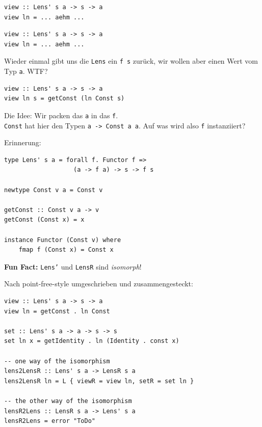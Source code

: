 \documentclass{beamer}
\begin{document}

\begin{frame}[fragile]
\begin{overprint}
\begin{verbatim}
view :: Lens' s a -> s -> a
view ln = ... aehm ...
\end{verbatim}
\begin{verbatim}
view :: Lens' s a -> s -> a
view ln = ... aehm ...
\end{verbatim}
Wieder einmal gibt uns die \texttt{Lens} ein \texttt{f s} zurück, wir wollen aber 
einen Wert vom Typ \texttt{a}. WTF?
\begin{verbatim}
view :: Lens' s a -> s -> a
view ln s = getConst (ln Const s) 
\end{verbatim}
\smallskip
Die Idee: Wir packen das \texttt{a} in das \texttt{f}.\\ \texttt{Const} hat hier den Typen \texttt{a -> Const a a}. Auf was wird also \texttt{f} instanziiert?
\end{overprint}
\vspace{0.3cm}
\begin{overprint}
Erinnerung:
\begin{verbatim}
type Lens' s a = forall f. Functor f =>
                   (a -> f a) -> s -> f s
                   
newtype Const v a = Const v

getConst :: Const v a -> v
getConst (Const x) = x

instance Functor (Const v) where
    fmap f (Const x) = Const x
\end{verbatim}
\end{overprint}

\end{frame}


\begin{frame}[fragile]

\textbf{Fun Fact:} \texttt{Lens'} und \texttt{LensR} sind \emph{isomorph}!
\smallskip\smallskip

Nach point-free-style umgeschrieben und zusammengesteckt:

\begin{verbatim}
view :: Lens' s a -> s -> a
view ln = getConst . ln Const

set :: Lens' s a -> a -> s -> s
set ln x = getIdentity . ln (Identity . const x)

-- one way of the isomorphism
lens2LensR :: Lens' s a -> LensR s a
lens2LensR ln = L { viewR = view ln, setR = set ln }

-- the other way of the isomorphism
lensR2Lens :: LensR s a -> Lens' s a
lensR2Lens = error "ToDo"
\end{verbatim}
 
\end{frame}
\end{document}
